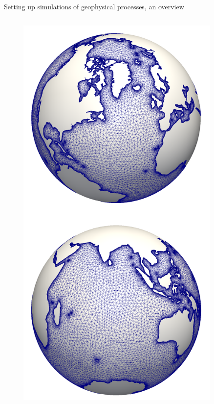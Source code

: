 \begin{frame}{Setting up simulations of geophysical processes, an overview}
\begin{columns}[l]
\column{1.5in}
\vspace{-0.4in}
\begin{figure}[htbp!]
 \centering
  \includegraphics[width=0.9\textwidth]{./tides_in_the_Mediterranean_Sea/figures/globe_mesh}
\end{figure}

\end{columns}

\end{frame}

